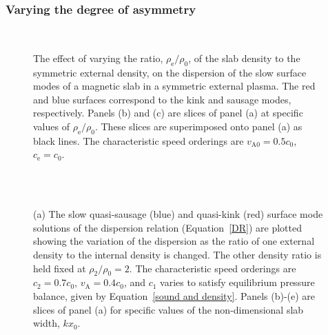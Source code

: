 \documentclass[12pt,draft]{../style-files/ociamthesis}
\begin{document}
\subsubsection{Varying the degree of asymmetry}

\begin{figure}
	\centering
	 \\
	\caption{The effect of varying the ratio, $\rho_\textrm{e}/\rho_0$, of the slab density to the symmetric external density, on the dispersion of the slow surface modes of a magnetic slab in a symmetric external plasma. The red and blue surfaces correspond to the kink and sausage modes, respectively. Panels (b) and (c) are slices of panel (a) at specific values of $\rho_\textrm{e}/\rho_0$. These slices are superimposed onto panel (a) as black lines. The characteristic speed orderings are $v_\textrm{A0} = 0.5c_0$, $c_\textrm{e} = c_0$.}
\end{figure}


\begin{figure}
	\centering
	 \\
	 \\
	\caption{(a) The slow quasi-sausage (blue) and quasi-kink (red) surface mode solutions of the dispersion relation (Equation~\eqref{DR}) are plotted showing the variation of the dispersion as the ratio of one external density to the internal density is changed. The other density ratio is held fixed at $\rho_2/\rho_0=2$. The characteristic speed orderings are $c_2=0.7c_0$, $v_\textrm{A}=0.4c_0$, and $c_1$ varies to satisfy equilibrium pressure balance, given by Equation~\eqref{sound and density}. Panels (b)-(e) are slices of panel (a) for specific values of the non-dimensional slab width, $kx_0$.}
\end{figure}
\end{document}
